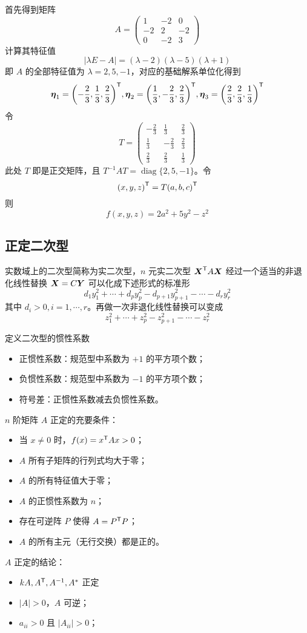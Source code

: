 \begin{solution}
	首先得到矩阵
	\[ A = \left(\begin{matrix}
				1 & -2 & 0 \\ -2 & 2 & -2 \\ 0 & -2 & 3
			\end{matrix}\right) \]
	计算其特征值
	\[ |\lambda E -A| = (\lambda - 2)(\lambda - 5)(\lambda + 1) \]
	即 $A$ 的全部特征值为 $\lambda = 2, 5, -1$，对应的基础解系单位化得到
	\[ \boldsymbol{\eta}_1 = {\left(-\frac{2}{3}, \frac{1}{3}, \frac{2}{3}\right)}^\mathsf{T}, \boldsymbol{\eta}_2 = {\left(\frac{1}{3}, -\frac{2}{3}, \frac{2}{3}\right)}^\mathsf{T}, \boldsymbol{\eta}_3 = {\left(\frac{2}{3}, \frac{2}{3}, \frac{1}{3}\right)}^\mathsf{T}  \]
	令
	\[ T = \left(\begin{matrix}
				-\frac{2}{3} & \frac{1}{3}  & \frac{2}{3} \\
				\frac{1}{3}  & -\frac{2}{3} & \frac{2}{3} \\
				\frac{2}{3}  & \frac{2}{3}  & \frac{1}{3}
			\end{matrix}\right) \]
	此处 $T$ 即是正交矩阵，且 $T^{-1}AT = \operatorname{diag}\{2, 5, -1\}$。令
	\[ {\left(x, y, z\right)}^\mathsf{T} = T {\left(a, b, c\right)}^\mathsf{T} \]
	则
	\[ f(x, y, z) = 2a^2 + 5y^2 - z^2 \]
\end{solution}

\subsection{正定二次型}

实数域上的二次型简称为实二次型，$n$ 元实二次型 ${\boldsymbol{X}}^\mathsf{T}A\boldsymbol{X}$ 经过一个适当的非退化线性替换 $\boldsymbol{X} = C\boldsymbol{Y}$ 可以化成下述形式的标准形
\[ d_1y_1^2+\cdots+d_py_p^2-d_{p+1}y_{p+1}^2-\cdots-d_ry_r^2 \]
其中 $d_i>0,i=1,\cdots,r$。再做一次非退化线性替换可以变成
\[ z_1^2+\cdots+z_p^2-z_{p+1}^2-\cdots-z_r^2 \]

定义二次型的惯性系数
\begin{itemize}
	\item 正惯性系数：规范型中系数为 $+1$ 的平方项个数；
	\item 负惯性系数：规范型中系数为 $-1$ 的平方项个数；
	\item 符号差：正惯性系数减去负惯性系数。
\end{itemize}

$n$ 阶矩阵 $A$ 正定的充要条件：
\begin{itemize}
	\item 当 $x \neq 0$ 时，$f(x) = {x}^\mathsf{T}Ax > 0$；
	\item $A$ 所有子矩阵的行列式均大于零；
	\item $A$ 的所有特征值大于零；
	\item $A$ 的正惯性系数为 $n$；
	\item 存在可逆阵 $P$ 使得 $A = {P}^\mathsf{T}P$；
	\item $A$ 的所有主元（无行交换）都是正的。
\end{itemize}

$A$ 正定的结论：
\begin{itemize}
	\item $kA, {A}^\mathsf{T}, A^{-1}, A^*$ 正定
	\item $|A|>0$，$A$ 可逆；
	\item $a_{ii} > 0$ 且 $|A_{ii}| > 0$；
\end{itemize}
